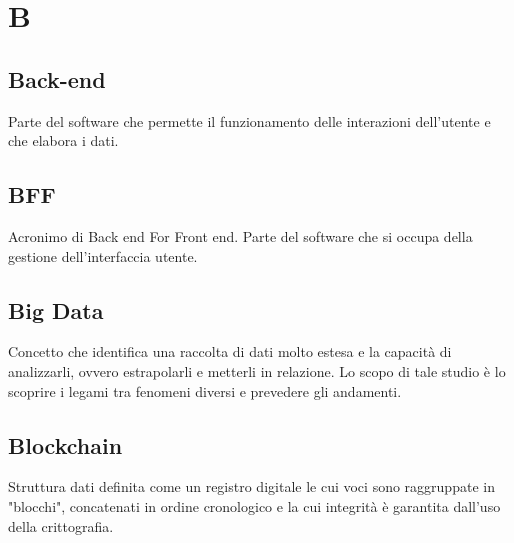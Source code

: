 \section*{B}
\markright{}

\subsection*{Back-end}
Parte del software che permette il funzionamento delle interazioni dell'utente e che elabora i dati.

\subsection*{BFF}
Acronimo di Back end For Front end. Parte del software che si occupa della gestione dell'interfaccia utente.

\subsection*{Big Data}
Concetto che identifica una raccolta di dati molto estesa e la capacità di analizzarli, ovvero estrapolarli e metterli in relazione. Lo scopo di tale studio è lo scoprire i legami tra fenomeni diversi e prevedere gli andamenti.

\subsection*{Blockchain}
Struttura dati definita come un registro digitale le cui voci sono raggruppate in "blocchi", concatenati in ordine cronologico e la cui integrità è garantita dall'uso della crittografia.